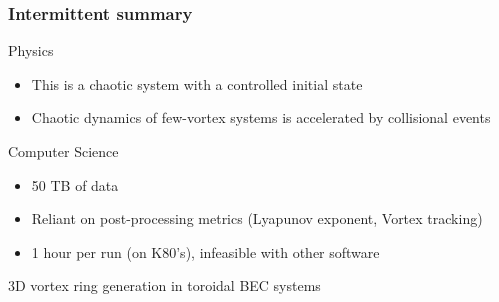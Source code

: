 \documentclass{beamer}
\begin{document}
\begin{frame}
\frametitle{Intermittent summary}
Physics
\begin{itemize}
\item This is a chaotic system with a controlled initial state
\item Chaotic dynamics of few-vortex systems is accelerated by collisional events
\end{itemize}

\vspace{0.5cm}
\pause

Computer Science
\begin{itemize}
\item 50 TB of data
\item Reliant on post-processing metrics (Lyapunov exponent, Vortex tracking)
\item 1 hour per run (on K80's), infeasible with other software
\end{itemize}
\end{frame}

\begin{frame}
\center \huge 3D vortex ring generation in toroidal BEC systems
\end{frame}
\end{document}
